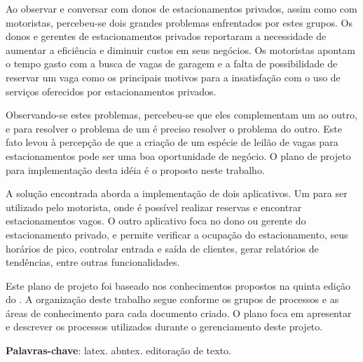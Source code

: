 \setlength{\absparsep}{18pt} %
\begin{resumo}

Ao observar e conversar com donos de estacionamentos privados, assim como com motoristas, percebeu-se dois grandes problemas enfrentados por estes grupos. Os donos e gerentes de estacionamentos privados reportaram a necessidade de aumentar a eficiência e diminuir custos em seus negócios. Os motoristas apontam o tempo gasto com a busca de vagas de garagem e a falta de possibilidade de reservar um vaga como os principais motivos para a insatisfação com o uso de serviços oferecidos por estacionamentos privados. 

Observando-se estes problemas, percebeu-se que eles complementam um ao outro, e para resolver o problema de um é preciso resolver o problema do outro. Este fato levou à percepção de que a criação de um espécie de leilão de vagas para estacionamentos pode ser uma boa oportunidade de negócio. O plano de projeto para implementação desta idéia é o proposto neste trabalho. 

A solução encontrada aborda a implementação de dois aplicativos. Um para ser utilizado pelo motorista, onde é possível realizar reservas e encontrar estacionamentos vagos. O outro aplicativo foca no dono ou gerente do estacionamento privado, e permite verificar a ocupação do estacionamento, seus horários de pico, controlar entrada e saída de clientes, gerar relatórios de tendências, entre outras funcionalidades.

Este plano de projeto foi baseado nos conhecimentos propostos na quinta edição do \cite{project2013guia}. A organização deste trabalho segue conforme os grupos de processos e as áreas de conhecimento para cada documento criado. O plano foca em apresentar e descrever os processos utilizados durante o gerenciamento deste projeto.

 \textbf{Palavras-chave}: latex. abntex. editoração de texto.
\end{resumo}